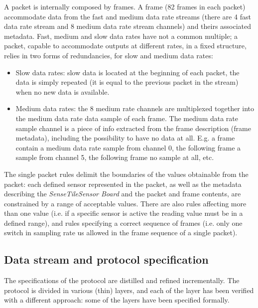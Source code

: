 \documentclass[english]{lni}
\newcommand{\ST}{\emph{SenseTile}\xspace}
\newcommand{\SB}{\emph{Sensor Board}\xspace}
\newcommand{\STSB}{\ST \SB\xspace}
\begin{document}
A packet is internally composed by frames. 
A frame (82 frames in each packet) accommodate data from the fast and medium data rate streams (there are 4 fast data rate stream and 8 medium data rate stream channels) and theirs associated metadata.
Fast, medium and slow data rates have not a common multiple; a packet, capable to accommodate outputs at different rates, in a fixed structure, relies in two forms of redundancies, for slow and medium data rates:
\begin{itemize}
\item Slow data rates: slow data is located at the beginning of each packet, the data is simply repeated (it is equal to the previous packet in the stream) when no new data is available.
\item Medium data rates: the 8 medium rate channels are multiplexed together into the medium data rate data sample of each frame. The medium data rate sample channel is a piece of info extracted from the frame description (frame metadata), including the possibility to have no data at all. 
E.g. a frame contain a medium data rate sample from channel 0, the following frame a sample from channel 5, the following frame no sample at all, etc.
\end{itemize}

The single packet rules delimit the boundaries of the values obtainable from the packet: each defined sensor represented in the packet, as well as the metadata describing the \STSB and the packet and frame contents, are constrained by a range of acceptable values.
There are also rules affecting more than one value (i.e. if a specific sensor is active the reading value must be in a defined range), and rules specifying a correct sequence of frames (i.e. only one switch in sampling rate us allowed in the frame sequence of a single packet).



\subsection{Data stream and protocol specification}
\label{subsec:data_stream_and_protocol_specification}

The specifications of the protocol are distilled and refined incrementally.
The protocol is divided in various (thin) layers, and each of the layer has been verified with a different approach: some of the layers have been specified formally. 
\end{document}
